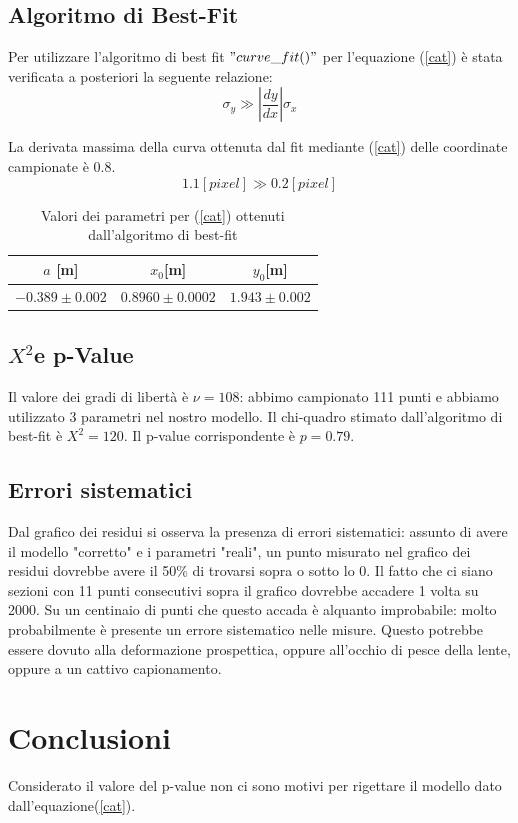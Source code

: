 \documentclass{article}
\begin{document}
\subsection{Algoritmo di Best-Fit}
Per utilizzare l'algoritmo di best fit $"curve\_fit()"$ per l'equazione (\ref{cat}) è stata verificata a posteriori la seguente relazione:
\begin{equation}
\sigma_{y} \gg \left| \frac{dy}{dx} \right| \sigma_{x}
\end{equation}

La derivata massima della curva ottenuta dal fit mediante (\ref{cat}) delle coordinate campionate è 0.8. 
\begin{equation}
1.1 [pixel] \gg 0.2[pixel]
\end{equation}


\begin{table}
\centering
	\begin{tabular}{|c|c|c|}

	\hline
		$a$ [m] & $x_0$[m] & $y_0$[m]\\
	\hline
	
		$-0.389\pm0.002$ & $0.8960\pm0.0002$ & $1.943\pm0.002$\\
	\hline
	
	\end{tabular}
	\caption{Valori dei parametri per (\ref{cat}) ottenuti dall'algoritmo di best-fit}
	
\end{table}


\subsection{$X^2$e p-Value}
Il valore dei gradi di libertà è $\nu=108$: abbimo campionato 111 punti e abbiamo utilizzato 3 parametri nel nostro modello. 
Il chi-quadro stimato dall'algoritmo di best-fit è $X^2=120$.
Il p-value corrispondente è $p=0.79$.

\subsection{Errori sistematici}
Dal grafico dei residui si osserva la presenza di errori sistematici: assunto di avere il modello "corretto" e i parametri "reali", un punto misurato nel grafico dei residui dovrebbe avere il 50\% di trovarsi sopra o sotto lo 0.
Il fatto che ci siano sezioni con 11 punti consecutivi sopra il grafico dovrebbe accadere 1 volta su 2000.  Su un centinaio di punti che questo accada è alquanto improbabile: molto probabilmente è presente un errore sistematico nelle misure. 
Questo potrebbe essere dovuto alla deformazione prospettica, oppure  all'occhio di pesce della lente, oppure a un cattivo capionamento. 

\section{Conclusioni}
Considerato il valore del p-value non ci sono motivi per rigettare il modello dato dall'equazione(\ref{cat}).
\end{document}
